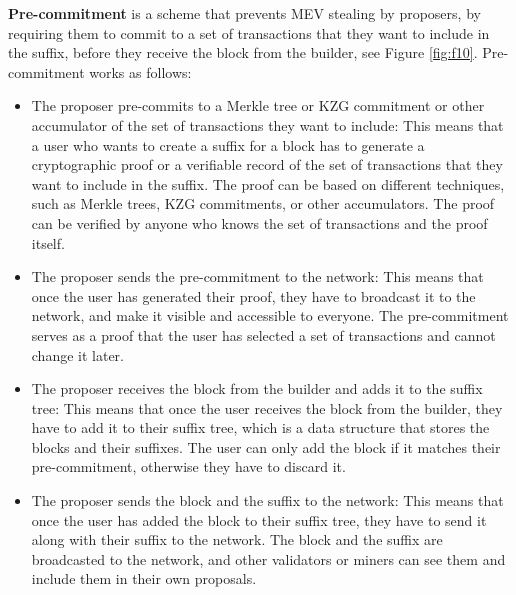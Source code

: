 \documentclass{report}
\begin{document}
\textbf{Pre-commitment} is a scheme that prevents MEV stealing by proposers, by requiring them to commit to a set of transactions that they want to include in the suffix, before they receive the block from the builder, see Figure \ref{fig:f10}. Pre-commitment works as follows:
\begin{itemize}
	\item The proposer pre-commits to a Merkle tree or KZG commitment or other accumulator of the set of transactions they want to include: This means that a user who wants to create a suffix for a block has to generate a cryptographic proof or a verifiable record of the set of transactions that they want to include in the suffix. The proof can be based on different techniques, such as Merkle trees, KZG commitments, or other accumulators. The proof can be verified by anyone who knows the set of transactions and the proof itself.
	\item The proposer sends the pre-commitment to the network: This means that once the user has generated their proof, they have to broadcast it to the network, and make it visible and accessible to everyone. The pre-commitment serves as a proof that the user has selected a set of transactions and cannot change it later.
	\item The proposer receives the block from the builder and adds it to the suffix tree: This means that once the user receives the block from the builder, they have to add it to their suffix tree, which is a data structure that stores the blocks and their suffixes. The user can only add the block if it matches their pre-commitment, otherwise they have to discard it.
	\item The proposer sends the block and the suffix to the network: This means that once the user has added the block to their suffix tree, they have to send it along with their suffix to the network. The block and the suffix are broadcasted to the network, and other validators or miners can see them and include them in their own proposals.
\end{itemize}
\end{document}

